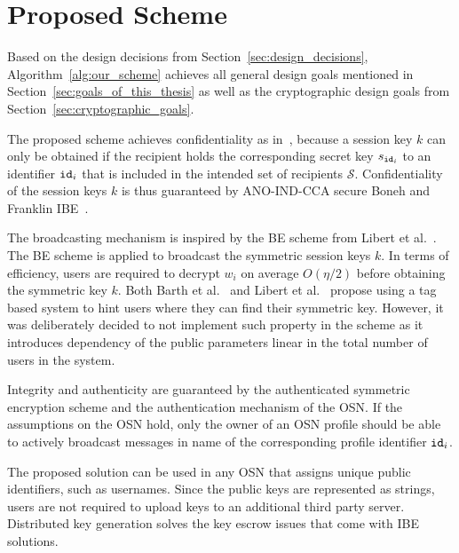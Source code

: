 
\section{Proposed Scheme}
\label{sec:proposed_scheme}
Based on the design decisions from Section~\ref{sec:design_decisions}, Algorithm~\ref{alg:our_scheme} achieves all general design goals mentioned in Section~\ref{sec:goals_of_this_thesis} as well as the cryptographic design goals from Section~\ref{sec:cryptographic_goals}.

The proposed scheme achieves confidentiality as in~\cite{art:BonehF01,art:LibertPQ12}, because a session key $k$ can only be obtained if the recipient holds the corresponding secret key $s_{\mathtt{id}_{i}}$ to an identifier $\mathtt{id}_{i}$ that is included in the intended set of recipients $\mathcal{S}$. Confidentiality of the session keys $k$ is thus guaranteed by ANO-IND-CCA secure Boneh and Franklin IBE~\cite{art:BonehF01}. 

The broadcasting mechanism is inspired by the BE scheme from Libert et al.~\cite{art:LibertPQ12}. The BE scheme is applied to broadcast the symmetric session keys $k$. In terms of efficiency, users are required to decrypt $w_i$ on average $O\left( \eta /2 \right)$ before obtaining the symmetric key $k$. Both Barth et al.~\cite{art:BarthBW06} and Libert et al.~\cite{art:LibertPQ12} propose using a tag based system to hint users where they can find their symmetric key. However, it was deliberately decided to not implement such property in the scheme as it introduces dependency of the public parameters linear in the total number of users in the system.

Integrity and authenticity are guaranteed by the authenticated symmetric encryption scheme and the authentication mechanism of the OSN. If the assumptions on the OSN hold, only the owner of an OSN profile should be able to actively broadcast messages in name of the corresponding profile identifier $\mathtt{id}_{i}$.

The proposed solution can be used in any OSN that assigns unique public identifiers, such as usernames. Since the public keys are represented as strings, users are not required to upload keys to an additional third party server. Distributed key generation solves the key escrow issues that come with IBE solutions.

